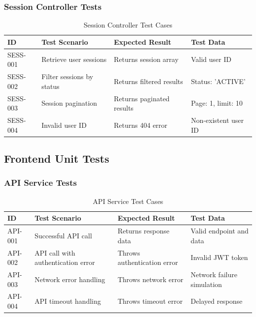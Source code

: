 \subsubsection{Session Controller Tests}
\begin{table}[H]
\centering
\small
\renewcommand{\arraystretch}{1.3}
\begin{tabularx}{\textwidth}{|l|>{\RaggedRight\arraybackslash}X|>{\RaggedRight\arraybackslash}X|>{\RaggedRight\arraybackslash}p{3.5cm}|}
\hline
\textbf{ID} & \textbf{Test Scenario} & \textbf{Expected Result} & \textbf{Test Data} \\
\hline
SESS-001 & Retrieve user sessions & Returns session array & Valid user ID \\
\hline
SESS-002 & Filter sessions by status & Returns filtered results & Status: 'ACTIVE' \\
\hline
SESS-003 & Session pagination & Returns paginated results & Page: 1, limit: 10 \\
\hline
SESS-004 & Invalid user ID & Returns 404 error & Non-existent user ID \\
\hline
\end{tabularx}
\caption{Session Controller Test Cases}
\label{tab:session-controller-tests}
\end{table}

\subsection{Frontend Unit Tests}

\subsubsection{API Service Tests}
\begin{table}[H]
\centering
\small
\renewcommand{\arraystretch}{1.3}
\begin{tabularx}{\textwidth}{|l|>{\RaggedRight\arraybackslash}X|>{\RaggedRight\arraybackslash}X|>{\RaggedRight\arraybackslash}p{3.5cm}|}
\hline
\textbf{ID} & \textbf{Test Scenario} & \textbf{Expected Result} & \textbf{Test Data} \\
\hline
API-001 & Successful API call & Returns response data & Valid endpoint and data \\
\hline
API-002 & API call with authentication error & Throws authentication error & Invalid JWT token \\
\hline
API-003 & Network error handling & Throws network error & Network failure simulation \\
\hline
API-004 & API timeout handling & Throws timeout error & Delayed response \\
\hline
\end{tabularx}
\caption{API Service Test Cases}
\label{tab:api-service-tests}
\end{table}

